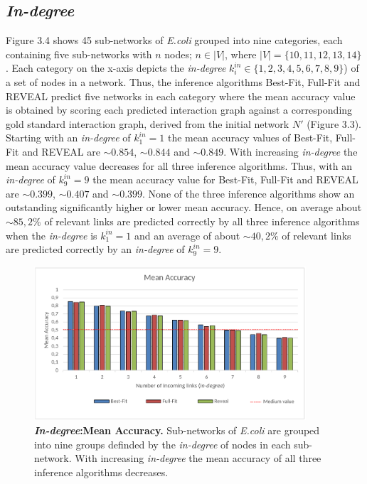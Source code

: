 \subsection*{\textit{In-degree}}
Figure 3.4 shows 45 sub-networks of \textit{E.coli} grouped into nine categories, each containing five sub-networks with $n$ nodes; $n\in |V|$, where $|V|=\{10,11,12,13,14\}$. Each category on the x-axis depicts the \textit{in-degree} $k^{in}_i \in \{1,2,3,4,5,6,7, 8, 9\}$) of a set of nodes in a network. Thus, the inference algorithms Best-Fit, Full-Fit and REVEAL predict five networks in each category where the mean accuracy value is obtained by scoring each predicted interaction graph against a corresponding gold standard interaction graph, derived from the initial network $N'$ (Figure 3.3).\\
Starting with an \textit{in-degree} of $k^{in}_{1}=1$ the mean accuracy values of Best-Fit, Full-Fit and REVEAL are $\sim 0.854$, $\sim 0.844$ and $\sim 0.849$. With increasing \textit{in-degree} the mean accuracy value decreases for all three inference algorithms. Thus, with an \textit{in-degree} of $k^{in}_{9}=9$ the mean accuracy value for Best-Fit, Full-Fit and REVEAL are $\sim 0.399$, $\sim 0.407$ and $\sim 0.399$. None of the three inference algorithms show an outstanding significantly higher or lower mean accuracy. Hence, on average about $\sim 85,2\% $ of relevant links are predicted correctly by all three inference algorithms when the \textit{in-degree} is $k^{in}_{1}=1$ and an average of about $\sim 40,2\% $ of relevant links are predicted correctly by an \textit{in-degree} of $k^{in}_{9}=9$.

\begin{figure}[H]
\captionsetup{width=0.9\linewidth}
\centering
\includegraphics[width=0.9\textwidth]{./Bilder/Scoring/insilico/1_Indegree_Runtime/MeanAcc_indegree.pdf}
\caption[\textit{In-degree}:Mean Accuracy]{\textbf{\textit{In-degree}:Mean Accuracy.} Sub-networks of \textit{E.coli} are grouped into nine groups definded by the \textit{in-degree} of nodes in each sub-network. With increasing \textit{in-degree} the mean accuracy of all three inference algorithms decreases.}
\label{fig:}
\end{figure}

